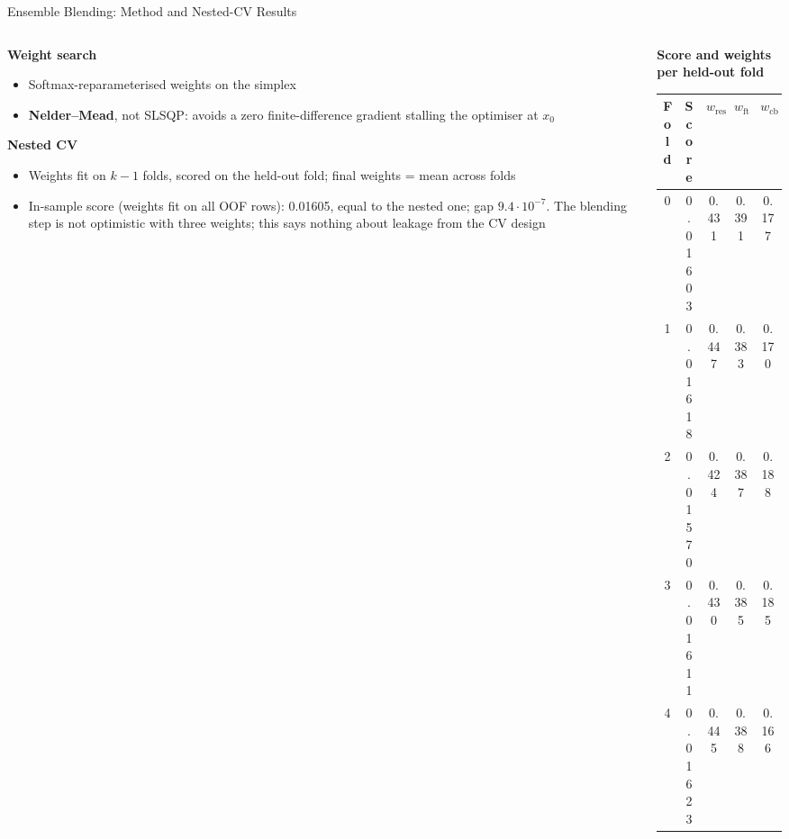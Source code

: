 \documentclass[9pt,aspectratio=169]{beamer}
\begin{document}
\begin{frame}{Ensemble Blending: Method and Nested-CV Results}
  \begin{columns}[T]
    \begin{column}{0.46\textwidth}
      \footnotesize
      \textbf{Weight search}
      \begin{itemize}
        \item Softmax-reparameterised weights on the simplex
        \item \textbf{Nelder--Mead}, not SLSQP: avoids a zero finite-difference gradient stalling the optimiser at $x_0$
      \end{itemize}
      \textbf{Nested CV}
      \begin{itemize}
        \item Weights fit on $k-1$ folds, scored on the held-out fold; final weights = mean across folds
        \item In-sample score (weights fit on all OOF rows): 0.01605, equal to the nested one; gap $9.4\cdot10^{-7}$. The blending step is not optimistic with three weights; this says nothing about leakage from the CV design
      \end{itemize}
    \end{column}
    \begin{column}{0.54\textwidth}
      \centering
      {\small\bfseries Score and weights per held-out fold}\\[1mm]
      \small
      \begin{tabular}{@{}ccccc@{}}
        \toprule
        \textbf{Fold} & \textbf{Score} & $w_{\text{resnet}}$ & $w_{\text{ft}}$ & $w_{\text{cb}}$ \\
        \midrule
        0 & 0.01603 & 0.431 & 0.391 & 0.177 \\
        1 & 0.01618 & 0.447 & 0.383 & 0.170 \\
        2 & 0.01570 & 0.424 & 0.387 & 0.188 \\
        3 & 0.01611 & 0.430 & 0.385 & 0.185 \\
        4 & 0.01623 & 0.445 & 0.388 & 0.166 \\
        \bottomrule
      \end{tabular}
    \end{column}
  \end{columns}
  \vspace{1mm}
  \begin{columns}[T]

\end{columns}
\end{frame}
\end{document}
